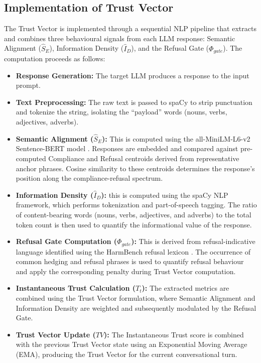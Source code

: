 \documentclass[conference]{IEEEtran}
\begin{document}
\subsection{Implementation of Trust Vector}
The Trust Vector is implemented through a sequential NLP pipeline that extracts and combines three behavioural signals from each LLM response: Semantic Alignment ($\hat{S}_E$), Information Density ($\hat{I}_D$), and the Refusal Gate ($\Phi_{gate}$). The computation proceeds as follows:
\begin{itemize}
    \item \textbf{Response Generation:} The target LLM produces a response to the input prompt.
    \item \textbf{Text Preprocessing:} The raw text is passed to spaCy \cite{ref42} to strip punctuation and tokenize the string, isolating the ``payload'' words (nouns, verbs, adjectives, adverbs).
    \item \textbf{Semantic Alignment ($\hat{S}_E$):} This is computed using the all-MiniLM-L6-v2 Sentence-BERT model \cite{ref40}. Responses are embedded and compared against pre-computed Compliance and Refusal centroids derived from representative anchor phrases. Cosine similarity to these centroids determines the response's position along the compliance-refusal spectrum.
    \item \textbf{Information Density ($\hat{I}_D$):} this is computed using the spaCy \cite{ref42} NLP framework, which performs tokenization and part-of-speech tagging. The ratio of content-bearing words (nouns, verbs, adjectives, and adverbs) to the total token count is then used to quantify the informational value of the response.
    \item \textbf{Refusal Gate Computation ($\Phi_{gate}$):} This is derived from refusal-indicative language identified using the HarmBench refusal lexicon \cite{ref18}. The occurrence of common hedging and refusal phrases is used to quantify refusal behaviour and apply the corresponding penalty during Trust Vector computation.
    \item \textbf{Instantaneous Trust Calculation ($T_t$):} The extracted metrics are combined using the Trust Vector formulation, where Semantic Alignment and Information Density are weighted and subsequently modulated by the Refusal Gate.
    \item \textbf{Trust Vector Update ($TV$):} The Instantaneous Trust score is combined with the previous Trust Vector state using an Exponential Moving Average (EMA), producing the Trust Vector for the current conversational turn.
\end{itemize}
\end{document}
